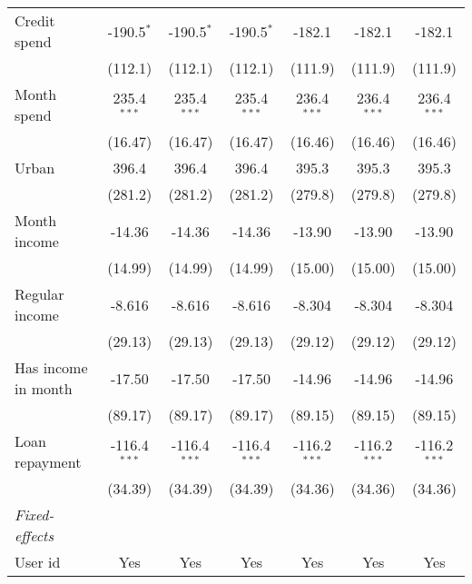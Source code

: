 \begin{table}[htbp]
\begin{threeparttable}[b]
\begin{tabular}{lcccccc}
         Credit spend        & -190.5$^{*}$   & -190.5$^{*}$   & -190.5$^{*}$   & -182.1         & -182.1         & -182.1\\   
                             & (112.1)        & (112.1)        & (112.1)        & (111.9)        & (111.9)        & (111.9)\\   
         Month spend         & 235.4$^{***}$  & 235.4$^{***}$  & 235.4$^{***}$  & 236.4$^{***}$  & 236.4$^{***}$  & 236.4$^{***}$\\   
                             & (16.47)        & (16.47)        & (16.47)        & (16.46)        & (16.46)        & (16.46)\\   
         Urban               & 396.4          & 396.4          & 396.4          & 395.3          & 395.3          & 395.3\\   
                             & (281.2)        & (281.2)        & (281.2)        & (279.8)        & (279.8)        & (279.8)\\   
         Month income        & -14.36         & -14.36         & -14.36         & -13.90         & -13.90         & -13.90\\   
                             & (14.99)        & (14.99)        & (14.99)        & (15.00)        & (15.00)        & (15.00)\\   
         Regular income      & -8.616         & -8.616         & -8.616         & -8.304         & -8.304         & -8.304\\   
                             & (29.13)        & (29.13)        & (29.13)        & (29.12)        & (29.12)        & (29.12)\\   
         Has income in month & -17.50         & -17.50         & -17.50         & -14.96         & -14.96         & -14.96\\   
                             & (89.17)        & (89.17)        & (89.17)        & (89.15)        & (89.15)        & (89.15)\\   
         Loan repayment      & -116.4$^{***}$ & -116.4$^{***}$ & -116.4$^{***}$ & -116.2$^{***}$ & -116.2$^{***}$ & -116.2$^{***}$\\   
                             & (34.39)        & (34.39)        & (34.39)        & (34.36)        & (34.36)        & (34.36)\\   
         \midrule
         \emph{Fixed-effects}\\
         User id             & Yes            & Yes            & Yes            & Yes            & Yes            & Yes\\  

\end{tabular}
\end{threeparttable}
\end{table}
